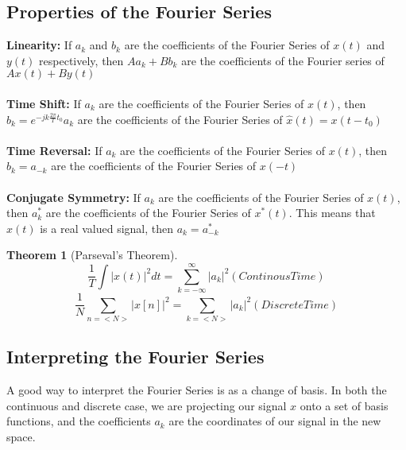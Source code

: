 \documentclass{article}
\newtheorem{theorem}{Theorem}
\begin{document}
\subsection{Properties of the Fourier Series}
\textbf{Linearity: }
If $a_k$ and $b_k$ are the coefficients of the Fourier Series of $x(t)$ and $y(t)$ respectively, then
$Aa_k + Bb_k$ are the coefficients of the Fourier series of $Ax(t)+By(t)$\\\\
\textbf{Time Shift: }
If $a_k$ are the coefficients of the Fourier Series of $x(t)$,
then $b_k = e^{-jk\frac{2\pi}{T}t_0}a_k$ are the coefficients of the Fourier Series of $\hat{x}(t)=x(t-t_0)$\\\\
\textbf{Time Reversal: }
If $a_k$ are the coefficients of the Fourier Series of $x(t)$,
then $b_k=a_{-k}$ are the coefficients of the Fourier Series of $x(-t)$\\\\
\textbf{Conjugate Symmetry: }
If $a_k$ are the coefficients of the Fourier Series of $x(t)$,
then $a_k^*$ are the coefficients of the Fourier Series of $x^*(t)$. 
This means that $x(t)$ is a real valued signal, then $a_k=a_{-k}^*$
\begin{theorem}[Parseval's Theorem]
    \begin{equation*}
        \frac{1}{T}\int{|x(t)|^2dt} = \sum_{k=-\infty}^{\infty}{|a_k|^2} (Continous Time)
    \end{equation*}
    \begin{equation*}
        \frac{1}{N}\sum_{n=<N>}{|x[n]|^2} = \sum_{k=<N>}{|a_k|^2} (Discrete Time)
    \end{equation*}
\end{theorem}
\subsection{Interpreting the Fourier Series}
A good way to interpret the Fourier Series is as a change of basis. In both the continuous and discrete case,
we are projecting our signal $x$ onto a set of basis functions, and the coefficients $a_k$ are the coordinates
of our signal in the new space.
\end{document}
